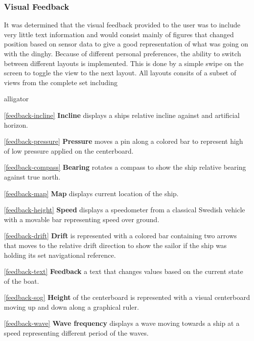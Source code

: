 \subsubsection{Visual Feedback}
It was determined that the visual feedback provided to the user was to include very little text information and would consist mainly of figures that changed position based on sensor data to give a good representation of what was going on with the dinghy. Because of different personal preferences, the ability to switch between different layouts is implemented. This is done by a simple swipe on the screen to toggle the view to the next layout. All layouts consits of a subset of views from the complete set including
\begin{labeling}{alligator}
\item [\ref{feedback-incline} \textbf{Incline}]  displays a ships relative incline against and artificial horizon.
\item [\ref{feedback-pressure} \textbf{Pressure}] moves a pin along a colored bar to represent high of low pressure applied on the centerboard.
\item [\ref{feedback-compass} \textbf{Bearing}] rotates a compass to show the ship relative bearing against true north.
\item [\ref{feedback-map} \textbf{Map}] displays current location of the ship.
\item [\ref{feedback-height} \textbf{Speed}] displays a speedometer from a classical Swedish vehicle\cite{volvo} with a movable bar representing speed over ground.
\item [\ref{feedback-drift} \textbf{Drift}] is represented with a colored bar containing two arrows that moves to the relative drift direction to show the sailor if the ship was holding its set navigational reference.
\item [\ref{feedback-text} \textbf{Feedback}] a text that changes values based on the current state of the boat.
\item [\ref{feedback-sog} \textbf{Height}] of the centerboard is represented with a visual centerboard moving up and down along a graphical ruler.
\item [\ref{feedback-wave} \textbf{Wave frequency}] displays a wave moving towards a ship at a speed representing different period of the waves.
\end{labeling}

